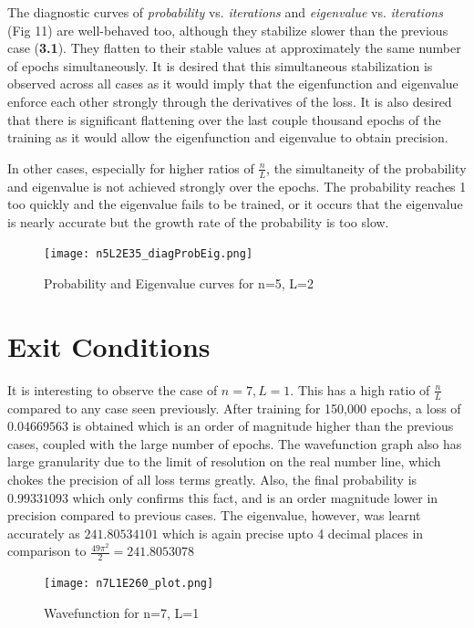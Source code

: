 \documentclass{article}
\newcommand{\iterations}{\textit{iterations} }
\newcommand{\eigenvalue}{\textit{eigenvalue} }
\newcommand{\probability}{\textit{probability} }
\newcommand{\nLratio}{$\displaystyle{\frac{n}{L}}$ }
\begin{document}
\justify
The diagnostic curves of \probability vs. \iterations and \eigenvalue vs. \iterations (Fig 11) are well-behaved too, although they stabilize slower than the previous case (\textbf{3.1}). They flatten to their stable values at approximately the same number of epochs simultaneously. It is desired that this simultaneous stabilization is observed across all cases as it would imply that the eigenfunction and eigenvalue enforce each other strongly through the derivatives of the loss. It is also desired that there is significant flattening over the last couple thousand epochs of the training as it would allow the eigenfunction and eigenvalue to obtain precision. 

\justify
In other cases, especially for higher ratios of $\displaystyle{\frac{n}{L}}$, the simultaneity of the probability and eigenvalue is not achieved strongly over the epochs. The probability reaches 1 too quickly and the eigenvalue fails to be trained, or it occurs that the eigenvalue is nearly accurate but the growth rate of the probability is too slow.

\newpage

\begin{figure}[!htb]
    \centering
    \texttt{[image: n5L2E35\_diagProbEig.png]}
    \label{fig:n5L2_diagProbEig}
    \caption{Probability and Eigenvalue curves for n=5, L=2}
\end{figure}

\section{Exit Conditions}

\justify
It is interesting to observe the case of $n = 7, L = 1$. This has a high ratio of \nLratio compared to any case seen previously. After training for 150,000 epochs, a loss of $0.04669563$ is obtained which is an order of magnitude higher than the previous cases, coupled with the large number of epochs. The wavefunction graph also has large granularity due to the limit of resolution on the real number line, which chokes the precision of all loss terms greatly. Also, the final probability is $0.99331093$ which only confirms this fact, and is an order magnitude lower in precision compared to previous cases. The eigenvalue, however, was learnt accurately as $241.80534101$ which is again precise upto 4 decimal places in comparison to $\displaystyle{\frac{49 \pi^2}{2} = 241.8053078}$


\begin{figure}[!htb]
    \centering
    \texttt{[image: n7L1E260\_plot.png]}
    \label{fig:n5L2_diagProbEig}
    \caption{Wavefunction for n=7, L=1}
\end{figure}
\end{document}
